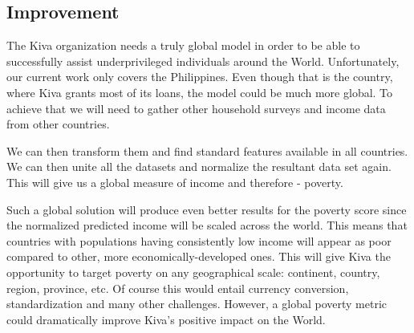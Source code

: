 \documentclass{article}
\begin{document}
\subsection{Improvement}

The Kiva organization needs a truly global model in order to be able to successfully assist underprivileged individuals around the World. Unfortunately, our current work only covers the Philippines. Even though that is the country, where Kiva grants most of its loans, the model could be much more global. To achieve that we will need to gather other household surveys and income data from other countries.

We can then transform them and find standard features available in all countries. We can then unite all the datasets and normalize the resultant data set again. This will give us a global measure of income and therefore - poverty.

Such a global solution will produce even better results for the poverty score since the normalized predicted income will be scaled across the world. This means that countries with populations having consistently low income will appear as poor compared to other, more economically-developed ones. This will give Kiva the opportunity to target poverty on any geographical scale: continent, country, region, province, etc. Of course this would entail currency conversion, standardization and many other challenges. However, a global poverty metric could dramatically improve Kiva’s positive impact on the World.

\end{document}
